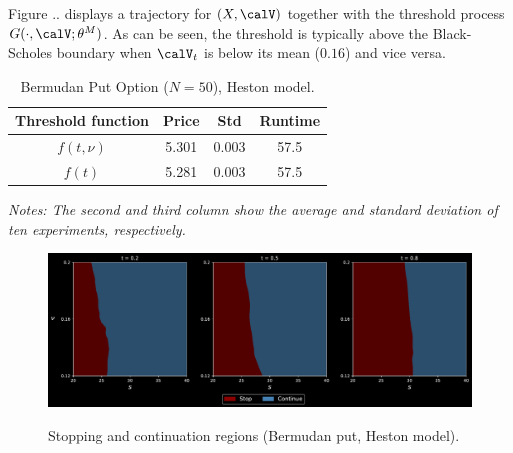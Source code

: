
Figure .. displays a trajectory for $(X,\calV)$ together with the threshold process $G(\cdot,\calV;\theta^M)$. As can be seen, the threshold is typically above the Black-Scholes boundary when $\calV_t$ is below its mean ($0.16$) and vice versa. 

\begin{table}[ht]
  \centering
  \caption{Bermudan Put Option ($N=50$), Heston model.  
 }
  \begin{tabular}{|c| c| c| c| }
 \hline
  Threshold function &  Price&  Std& Runtime  \\
  \hline 
    $f(t,\nu)$ & 5.301 & 0.003 &  57.5 \\
  $f(t)$ & 5.281 & 0.003 &  57.5  \\
  \hline
\end{tabular}
\vspace{2mm}

\scriptsize{
\textit{Notes: The second and third column show the average and standard deviation of ten experiments, respectively.  }}
\label{tab:resultPutBS}
  \end{table}
  
\begin{figure}
    \centering
     \caption{Stopping and continuation regions (Bermudan put, Heston model).}
    \includegraphics[scale = 0.42]{FB/Figures/2DPlotHeston.pdf}
    \label{fig:asymCall}
\end{figure}




